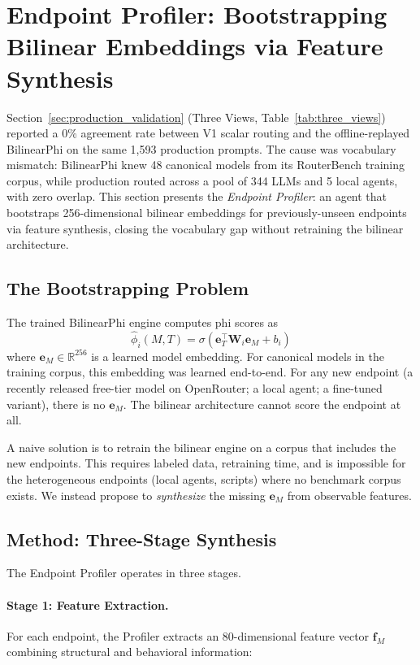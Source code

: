 \section{Endpoint Profiler: Bootstrapping Bilinear Embeddings via Feature Synthesis}
\label{sec:endpoint_profiler}

Section~\ref{sec:production_validation} (Three Views, Table~\ref{tab:three_views}) reported a 0\% agreement rate between V1 scalar routing and the offline-replayed BilinearPhi on the same 1{,}593 production prompts. The cause was vocabulary mismatch: BilinearPhi knew 48 canonical models from its RouterBench training corpus, while production routed across a pool of 344 LLMs and 5 local agents, with zero overlap. This section presents the \emph{Endpoint Profiler}: an agent that bootstraps 256-dimensional bilinear embeddings for previously-unseen endpoints via feature synthesis, closing the vocabulary gap without retraining the bilinear architecture.

\subsection{The Bootstrapping Problem}

The trained BilinearPhi engine computes phi scores as
\[
\hat{\phi}_i(M, T) = \sigma\!\left(\mathbf{e}_T^\top \mathbf{W}_i \mathbf{e}_M + b_i\right)
\]
where $\mathbf{e}_M \in \mathbb{R}^{256}$ is a learned model embedding. For canonical models in the training corpus, this embedding was learned end-to-end. For any new endpoint (a recently released free-tier model on OpenRouter; a local agent; a fine-tuned variant), there is no $\mathbf{e}_M$. The bilinear architecture cannot score the endpoint at all.

A naive solution is to retrain the bilinear engine on a corpus that includes the new endpoints. This requires labeled data, retraining time, and is impossible for the heterogeneous endpoints (local agents, scripts) where no benchmark corpus exists. We instead propose to \emph{synthesize} the missing $\mathbf{e}_M$ from observable features.

\subsection{Method: Three-Stage Synthesis}

The Endpoint Profiler operates in three stages.

\paragraph{Stage 1: Feature Extraction.} For each endpoint, the Profiler extracts an 80-dimensional feature vector $\mathbf{f}_M$ combining structural and behavioral information:

